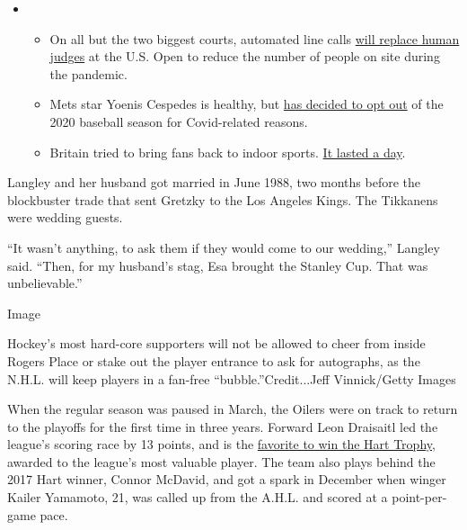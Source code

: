 \begin{itemize}
\item
  \begin{itemize}
  \tightlist
  \item
    On all but the two biggest courts, automated line calls
    \href{https://www.nytimes3xbfgragh.onion/2020/08/03/sports/tennis/us-open-hawkeye-line-judges.html?action=click\&pgtype=Article\&state=default\&region=MAIN_CONTENT_2\&context=storylines_keepup}{will
    replace human judges} at the U.S. Open to reduce the number of
    people on site during the pandemic.
  \item
    Mets star Yoenis Cespedes is healthy, but
    \href{https://www.nytimes3xbfgragh.onion/2020/08/02/sports/baseball/Yoenis-cespedes-opt-out-rule.html?action=click\&pgtype=Article\&state=default\&region=MAIN_CONTENT_2\&context=storylines_keepup}{has
    decided to opt out} of the 2020 baseball season for Covid-related
    reasons.
  \item
    Britain tried to bring fans back to indoor sports.
    \href{https://www.nytimes3xbfgragh.onion/2020/08/02/sports/snooker-world-championship.html?action=click\&pgtype=Article\&state=default\&region=MAIN_CONTENT_2\&context=storylines_keepup}{It
    lasted a day}.
  \end{itemize}
\end{itemize}

Langley and her husband got married in June 1988, two months before the
blockbuster trade that sent Gretzky to the Los Angeles Kings. The
Tikkanens were wedding guests.

``It wasn't anything, to ask them if they would come to our wedding,''
Langley said. ``Then, for my husband's stag, Esa brought the Stanley
Cup. That was unbelievable.''

Image

Hockey's most hard-core supporters will not be allowed to cheer from
inside Rogers Place or stake out the player entrance to ask for
autographs, as the N.H.L. will keep players in a fan-free
``bubble.''Credit...Jeff Vinnick/Getty Images

When the regular season was paused in March, the Oilers were on track to
return to the playoffs for the first time in three years. Forward Leon
Draisaitl led the league's scoring race by 13 points, and is the
\href{https://www.nytimes3xbfgragh.onion/2020/07/27/sports/hockey/nhl-awards-restart-postseason.html}{favorite
to win the Hart Trophy,} awarded to the league's most valuable player.
The team also plays behind the 2017 Hart winner, Connor McDavid, and got
a spark in December when winger Kailer Yamamoto, 21, was called up from
the A.H.L. and scored at a point-per-game pace.

